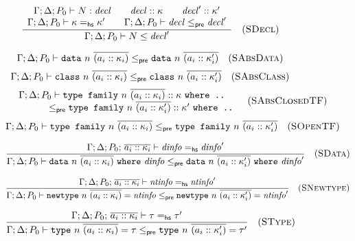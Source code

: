 \begin{figure}


\[
\frac{
\begin{array}{c}
\Gamma; \Delta; P_0 \vdash N : \mathit{decl} \qquad
\mathit{decl} :: \kappa \qquad
\mathit{decl}' :: \kappa' \\
\Gamma; \Delta; P_0 \vdash \kappa =_\mathsf{hs} \kappa' \qquad
\Gamma; \Delta; P_0 \vdash \mathit{decl} \le_\textsf{pre} \mathit{decl}'
\end{array}
}{
\Gamma; \Delta; P_0 \vdash N \le \mathit{decl}'
}
\quad(\textsc{SDecl})
\]


\[
\Gamma; \Delta; P_0 \vdash \texttt{data}~n~\overline{(a_i :: \kappa_i)} \le_\textsf{pre} \texttt{data}~n~\overline{(a_i :: \kappa'_i)}
\quad(\textsc{SAbsData})
\]
\[
\Gamma; \Delta; P_0 \vdash \texttt{class}~n~\overline{(a_i :: \kappa_i)} \le_\textsf{pre} \texttt{class}~n~\overline{(a_i :: \kappa'_i)}
\quad(\textsc{SAbsClass})
\]
\[
\begin{array}{c}
\Gamma; \Delta; P_0 \vdash \texttt{type family}~n~\overline{(a_i :: \kappa_i)} :: \kappa ~\texttt{where ..} \\
\qquad\qquad\le_\textsf{pre} \texttt{type family}~n~\overline{(a_i :: \kappa'_i)} :: \kappa' ~\texttt{where ..}
\end{array}
\quad(\textsc{SAbsClosedTF})
\]
\[
\Gamma; \Delta; P_0 \vdash \texttt{type family}~n~\overline{(a_i :: \kappa_i)} \le_\textsf{pre} \texttt{type family}~n~\overline{(a_i :: \kappa'_i)}
\quad(\textsc{SOpenTF})
\]


\[
\frac{
\Gamma; \Delta; P_0;\, \overline{a_i :: \kappa_i} \vdash \mathit{dinfo} =_\textsf{hs} \mathit{dinfo}'
}{
\Gamma; \Delta; P_0 \vdash \texttt{data}~n~\overline{(a_i :: \kappa_i)} ~\texttt{where}~ \mathit{dinfo} \le_\textsf{pre} \texttt{data}~n~\overline{(a_i :: \kappa'_i)} ~\texttt{where}~ \mathit{dinfo}'
}
\quad(\textsc{SData})
\]

\[
\frac{
\Gamma; \Delta; P_0;\, \overline{a_i :: \kappa_i} \vdash \mathit{ntinfo} =_\textsf{hs} \mathit{ntinfo}'
}{
\Gamma; \Delta; P_0 \vdash \texttt{newtype}~n~\overline{(a_i :: \kappa_i)} = \mathit{ntinfo} \le_\textsf{pre} \texttt{newtype}~n~\overline{(a_i :: \kappa'_i)} = \mathit{ntinfo}'
}
\quad(\textsc{SNewtype})
\]

\[
\frac{
\Gamma; \Delta; P_0;\, \overline{a_i :: \kappa_i} \vdash \tau =_\textsf{hs} \tau'
}{
\Gamma; \Delta; P_0 \vdash \texttt{type}~n~\overline{(a_i :: \kappa_i)} = \tau \le_\textsf{pre} \texttt{type}~n~\overline{(a_i :: \kappa'_i)} = \tau'
}
\quad(\textsc{SType})
\]


\end{figure}
